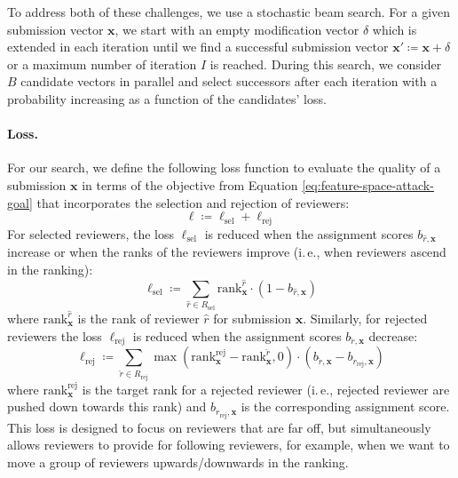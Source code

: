 \documentclass[letterpaper,twocolumn,10pt]{article}
\newcommand{\ie}{i.\,e.}
\newcommand{\bow}{\textbf{x}}
\newcommand{\submission}{\bow}
\newcommand{\reviewersubset}{R}
\newcommand{\reviewer}{r}
\newcommand{\select}{\text{sel}}
\newcommand{\reject}{\text{rej}}
\newcommand{\requestedreviewers}{\reviewersubset_{\select}}
\newcommand{\rejectedreviewers}{\reviewersubset_{\reject}}
\newcommand{\bid}{b}
\newcommand{\loss}{\ell}
\newcommand{\maxitr}{I}
\newcommand{\modifications}{\delta}
\begin{document}
To address both of these challenges, we use a {stochastic\EndAccSupp{}} beam search. For a given submission vector $\submission$, we start with an empty modification vector $\modifications$ which is extended in each iteration until we find a successful submission vector $\submission' \coloneqq \submission + \modifications$ or a maximum number of iteration $\maxitr$ is reached. During this search, we consider $B$ candidate vectors in parallel and select successors after each iteration with a probability increasing as a function of the candidates' loss. 

\paragraph{Loss.}
For our search, we define the following loss function to evaluate the quality of a submission $\submission$ in terms of the objective from Equation \ref{eq:feature-space-attack-goal} that incorporates the selection and rejection of reviewers:
\begin{equation}
    \loss \coloneqq \loss_{\select} + \loss_{\reject}
\end{equation}
For selected reviewers, the loss $\loss_{\select}$ is reduced when the assignment scores $\bid_{\hat{\reviewer}, \submission}$ increase or when the ranks of the reviewers improve (\ie{}, when reviewers ascend in the ranking):
\begin{equation}
\loss_{\select} \coloneqq \sum_{\hat{\reviewer} \in \requestedreviewers}{\text{rank}_\submission^{\hat{\reviewer}} \cdot (1 - \bid_{\hat{\reviewer}, \submission})}
\end{equation}
where $\text{rank}_\submission^{\hat{\reviewer}}$ is the rank of reviewer $\hat{\reviewer}$ for submission $\submission$.
Similarly, for rejected reviewers the loss $\loss_{\reject}$ is reduced when the assignment scores $\bid_{\check{\reviewer}, \submission}$ decrease:
\begin{equation}
\loss_{\reject} \coloneqq \sum_{\check{\reviewer} \in \rejectedreviewers}{\max(\text{rank}^{\reject}_{\submission} - \text{rank}_\submission^{\check{\reviewer}}, 0) \cdot (\bid_{\check{\reviewer}, \submission} - \bid_{\reviewer_{\reject}, \submission})}
\end{equation}
where $\text{rank}^{\reject}_{\submission}$ is the target rank for a rejected reviewer (\ie{}, rejected reviewer are pushed down towards this rank) and $\bid_{\reviewer_{\reject}, \submission}$ is the corresponding assignment score.
This loss is designed to focus on reviewers that are far off, but simultaneously allows reviewers to provide  for following reviewers, for example, when we want to move a group of reviewers upwards/downwards in the ranking.
\end{document}
